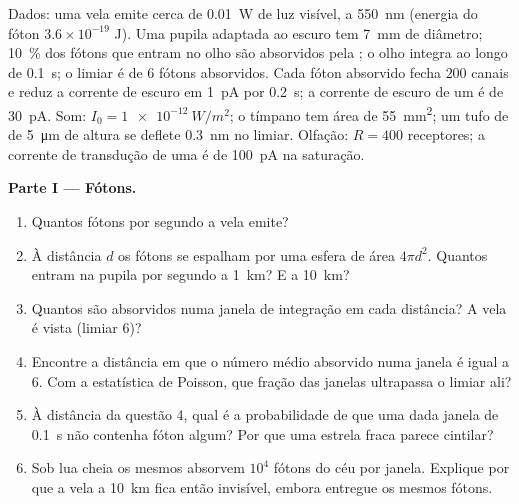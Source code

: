 \begin{problem}
\label{pb:b3:sensory-systems:1}
Dados: uma vela emite cerca de \qty{0.01}{W} de luz visível, a
\qty{550}{nm} (energia do fóton $3.6\times 10^{-19}$ J). Uma pupila
adaptada ao escuro tem \qty{7}{mm} de diâmetro; \qty{10}{\%} dos fótons
que entram no olho são absorvidos pela ; o olho integra ao
longo de \qty{0.1}{s}; o limiar é de $6$ fótons absorvidos. Cada fóton
absorvido fecha $200$ canais e reduz a corrente de escuro em
\qty{1}{pA} por \qty{0.2}{s}; a corrente de escuro de um  é de
\qty{30}{pA}. Som: $I_{0} =
\qty{1e-12}{W/m^2}$; o tímpano tem área de
\qty{55}{mm^2}; um tufo de  de \qty{5}{\micro m} de altura se
deflete \qty{0.3}{nm} no limiar. Olfação: $R = 400$ receptores; a
corrente de transdução de uma  é de \qty{100}{pA} na
saturação.

\medskip
\noindent\textbf{Parte I --- Fótons.}
\begin{enumerate}
  \item Quantos fótons por segundo a vela emite?
  \item À distância $d$ os fótons se espalham por uma esfera de área
        $4\pi d^{2}$. Quantos entram na pupila por segundo a
        \qty{1}{km}? E a \qty{10}{km}?
  \item Quantos são absorvidos numa janela de integração em cada
        distância? A vela é vista (limiar $6$)?
  \item Encontre a distância em que o número médio absorvido numa janela
        é igual a $6$. Com a estatística de Poisson, que fração das
        janelas ultrapassa o limiar ali?
  \item À distância da questão 4, qual é a probabilidade de que uma dada
        janela de \qty{0.1}{s} não contenha fóton algum? Por que uma
        estrela fraca parece cintilar?
  \item Sob lua cheia os mesmos  absorvem $10^{4}$ fótons do
        céu por janela. Explique por que a vela a \qty{10}{km} fica
        então invisível, embora entregue os mesmos fótons.
\end{enumerate}


\end{problem}
